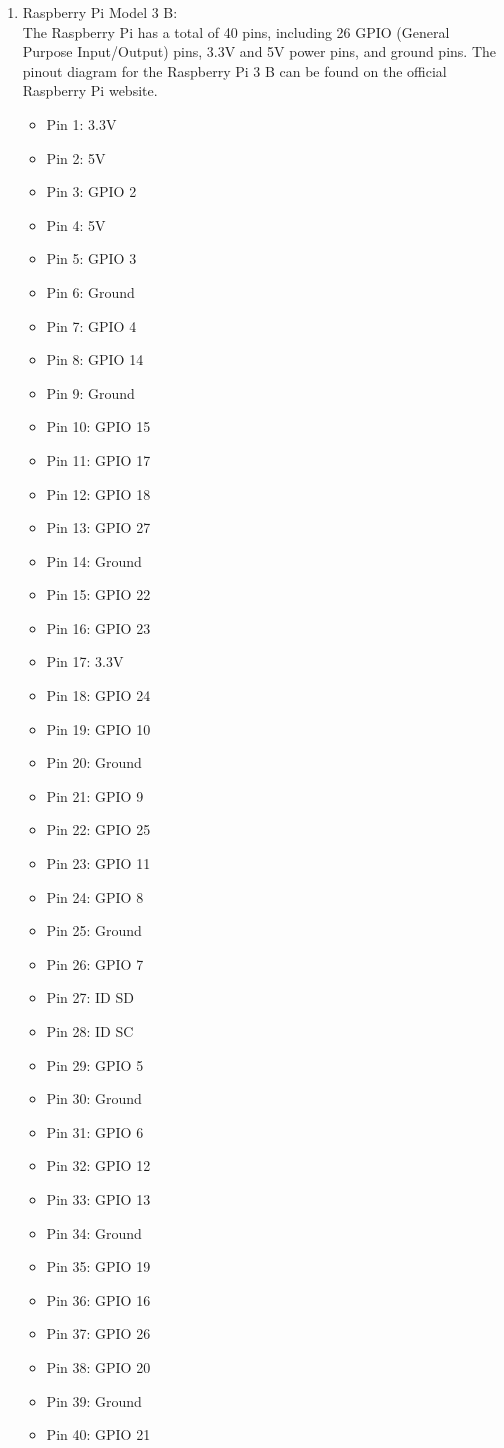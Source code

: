 \documentclass[11pt]{article}
\begin{document}
\begin{enumerate}
	\item Raspberry Pi Model 3 B: \\
	      The Raspberry Pi has a total of 40 pins, including 26 GPIO (General Purpose Input/Output) pins, 3.3V and 5V power pins, and ground pins. The pinout diagram for the Raspberry Pi 3 B can be found on the official Raspberry Pi website.

	      \begin{itemize}
		      \item Pin 1: 3.3V
		      \item Pin 2: 5V
		      \item Pin 3: GPIO 2
		      \item Pin 4: 5V
		      \item Pin 5: GPIO 3
		      \item Pin 6: Ground
		      \item Pin 7: GPIO 4
		      \item Pin 8: GPIO 14
		      \item Pin 9: Ground
		      \item Pin 10: GPIO 15
		      \item Pin 11: GPIO 17
		      \item Pin 12: GPIO 18
		      \item Pin 13: GPIO 27
		      \item Pin 14: Ground
		      \item Pin 15: GPIO 22
		      \item Pin 16: GPIO 23
		      \item Pin 17: 3.3V
		      \item Pin 18: GPIO 24
		      \item Pin 19: GPIO 10
		      \item Pin 20: Ground
		      \item Pin 21: GPIO 9
		      \item Pin 22: GPIO 25
		      \item Pin 23: GPIO 11
		      \item Pin 24: GPIO 8
		      \item Pin 25: Ground
		      \item Pin 26: GPIO 7
		      \item Pin 27: ID SD
		      \item Pin 28: ID SC
		      \item Pin 29: GPIO 5
		      \item Pin 30: Ground
		      \item Pin 31: GPIO 6
		      \item Pin 32: GPIO 12
		      \item Pin 33: GPIO 13
		      \item Pin 34: Ground
		      \item Pin 35: GPIO 19
		      \item Pin 36: GPIO 16
		      \item Pin 37: GPIO 26
		      \item Pin 38: GPIO 20
		      \item Pin 39: Ground
		      \item Pin 40: GPIO 21
	      \end{itemize}


\end{enumerate}
\end{document}
